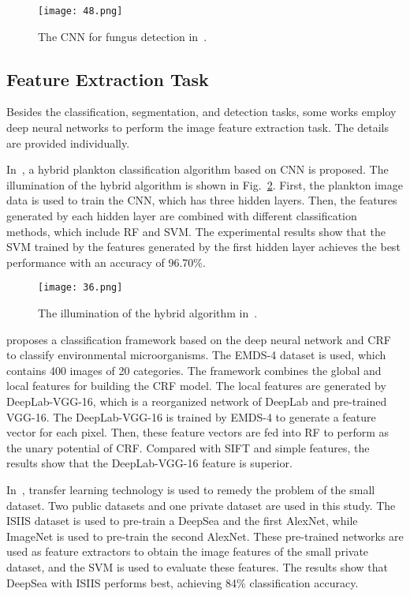 \begin{figure}[htbp!]
\centering
\texttt{[image: 48.png]}
\caption{The CNN for fungus detection in~\cite{Tahir-2018-AFSD}.}
\label{fig48}
\end{figure}



\subsection{Feature Extraction Task}
Besides the classification, segmentation, and detection tasks, some works employ deep neural networks to perform the image feature extraction task. The details are provided individually.

In~\cite{Al-2015-PEHC}, a hybrid plankton classification algorithm based on CNN is proposed. The illumination of the hybrid algorithm is shown in Fig.~\ref{fig36}. First, the plankton image data is used to train the CNN, which has three hidden layers. Then, the features generated by each hidden layer are combined with different classification methods, which include RF and SVM. The experimental results show that the SVM trained by the features generated by the first hidden layer achieves the best performance with an accuracy of 96.70\%.

\begin{figure}[htbp!]
\centering
\texttt{[image: 36.png]}
\caption{The illumination of the hybrid algorithm in~\cite{Al-2015-PEHC}.}
\label{fig36}
\end{figure}

\cite{Kosov-2018-EMCU} proposes a classification framework based on the deep neural network and CRF to classify environmental microorganisms. The EMDS-4 dataset is used, which contains 400 images of 20 categories. The framework combines the global and local features for building the CRF model. The local features are generated by DeepLab-VGG-16, which is a reorganized network of DeepLab and pre-trained VGG-16. The DeepLab-VGG-16 is trained by EMDS-4 to generate a feature vector for each pixel. Then, these feature vectors are fed into RF to perform as the unary potential of CRF. Compared with SIFT and simple features, the results show that the DeepLab-VGG-16 feature is superior.

In~\cite{Rodrigues-2018-ETLS}, transfer learning technology is used to remedy the problem of the small dataset. Two public datasets and one private dataset are used in this study. The ISIIS dataset is used to pre-train a DeepSea and the first AlexNet, while ImageNet is used to pre-train the second AlexNet. These pre-trained networks are used as feature extractors to obtain the image features of the small private dataset, and the SVM is used to evaluate these features. The results show that DeepSea with ISIIS performs best, achieving 84\% classification accuracy.


